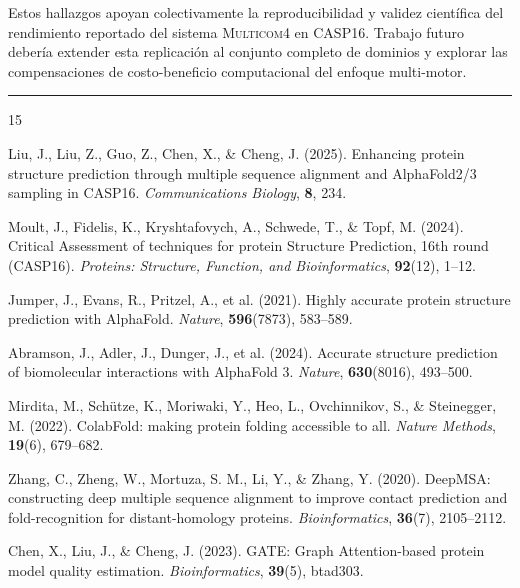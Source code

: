 \documentclass[10pt,twocolumn,a4paper]{article}
\newcommand{\multicom}{\textsc{Multicom4}}
\begin{document}
Estos hallazgos apoyan colectivamente la reproducibilidad y validez científica del rendimiento reportado del sistema \multicom{} en CASP16. Trabajo futuro debería extender esta replicación al conjunto completo de dominios y explorar las compensaciones de costo-beneficio computacional del enfoque multi-motor.


\vspace{8pt}
\noindent\textcolor{headerblue}{\rule{\columnwidth}{0.5pt}}
\vspace{4pt}

\begin{thebibliography}{15}
\small

Liu, J., Liu, Z., Guo, Z., Chen, X., \& Cheng, J. (2025).
Enhancing protein structure prediction through multiple sequence alignment and AlphaFold2/3 sampling in CASP16.
\textit{Communications Biology}, \textbf{8}, 234.

Moult, J., Fidelis, K., Kryshtafovych, A., Schwede, T., \& Topf, M. (2024).
Critical Assessment of techniques for protein Structure Prediction, 16th round (CASP16).
\textit{Proteins: Structure, Function, and Bioinformatics}, \textbf{92}(12), 1--12.

Jumper, J., Evans, R., Pritzel, A., et al. (2021).
Highly accurate protein structure prediction with AlphaFold.
\textit{Nature}, \textbf{596}(7873), 583--589.

Abramson, J., Adler, J., Dunger, J., et al. (2024).
Accurate structure prediction of biomolecular interactions with AlphaFold 3.
\textit{Nature}, \textbf{630}(8016), 493--500.

Mirdita, M., Schütze, K., Moriwaki, Y., Heo, L., Ovchinnikov, S., \& Steinegger, M. (2022).
ColabFold: making protein folding accessible to all.
\textit{Nature Methods}, \textbf{19}(6), 679--682.

Zhang, C., Zheng, W., Mortuza, S. M., Li, Y., \& Zhang, Y. (2020).
DeepMSA: constructing deep multiple sequence alignment to improve contact prediction and fold-recognition for distant-homology proteins.
\textit{Bioinformatics}, \textbf{36}(7), 2105--2112.

Chen, X., Liu, J., \& Cheng, J. (2023).
GATE: Graph Attention-based protein model quality estimation.
\textit{Bioinformatics}, \textbf{39}(5), btad303.


\end{thebibliography}
\end{document}
